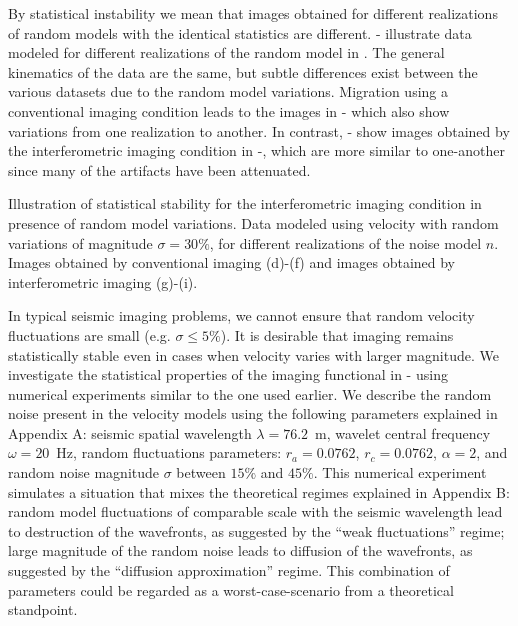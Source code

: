 By statistical instability we mean that images obtained for different
realizations of random models with the identical statistics are
different. - illustrate data
modeled for different realizations of the random model in
. The general kinematics of the data are the same,
but subtle differences exist between the various datasets due
to the random model variations.  Migration using a
conventional imaging condition leads to the images in
- which also show
variations from one realization to another.  In
contrast, - show images
obtained by the interferometric imaging condition in
-, which are more similar to one-another since many
of the artifacts have been attenuated.

{Illustration of statistical stability for the interferometric imaging
condition in presence of random model variations. Data modeled using
velocity with random variations of magnitude $\sigma=30\%$, for
different realizations of the noise model $n$. Images obtained by
conventional imaging (d)-(f) and images obtained by interferometric
imaging (g)-(i).}

In typical seismic imaging problems, we cannot ensure that random
velocity fluctuations are small (e.g. $\sigma\le 5\%$). It is
desirable that imaging remains statistically stable even in cases when
velocity varies with larger magnitude. We investigate the statistical
properties of the imaging functional in - using
numerical experiments similar to the one used earlier. We describe the
random noise present in the velocity models using the following
parameters explained in Appendix A: seismic spatial wavelength
$\lambda=76.2$~m, wavelet central frequency $\omega=20$~Hz, random
fluctuations parameters: $r_a=0.0762$, $r_c=0.0762$, $\alpha=2$, and
random noise magnitude $\sigma$ between $15\%$ and $45\%$. This
numerical experiment simulates a situation that mixes the theoretical
regimes explained in Appendix B: random model fluctuations of
comparable scale with the seismic wavelength lead to destruction of
the wavefronts, as suggested by the ``weak fluctuations'' regime;
large magnitude of the random noise leads to diffusion of the
wavefronts, as suggested by the ``diffusion approximation''
regime. This combination of parameters could be regarded as a
worst-case-scenario from a theoretical standpoint.

